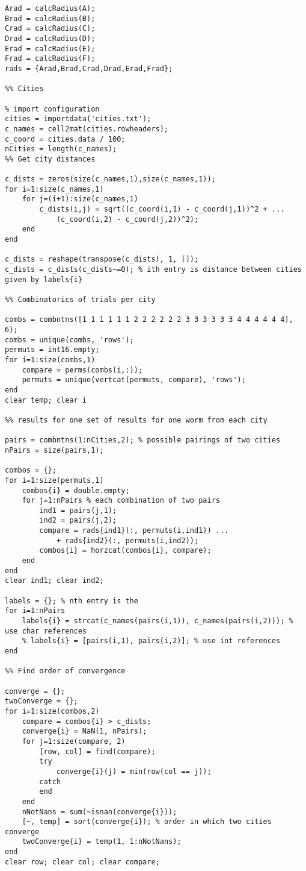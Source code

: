 \documentclass[10pt]{article}
\begin{document}
\begin{verbatim}
Arad = calcRadius(A);
Brad = calcRadius(B);
Crad = calcRadius(C);
Drad = calcRadius(D);
Erad = calcRadius(E);
Frad = calcRadius(F);
rads = {Arad,Brad,Crad,Drad,Erad,Frad};

%% Cities

% import configuration
cities = importdata('cities.txt');
c_names = cell2mat(cities.rowheaders);
c_coord = cities.data / 100;
nCities = length(c_names);
%% Get city distances

c_dists = zeros(size(c_names,1),size(c_names,1));
for i=1:size(c_names,1)
    for j=(i+1):size(c_names,1)
        c_dists(i,j) = sqrt((c_coord(i,1) - c_coord(j,1))^2 + ...
            (c_coord(i,2) - c_coord(j,2))^2);
    end
end

c_dists = reshape(transpose(c_dists), 1, []);
c_dists = c_dists(c_dists~=0); % ith entry is distance between cities given by labels{i}

%% Combinatorics of trials per city

combs = combntns([1 1 1 1 1 1 2 2 2 2 2 2 3 3 3 3 3 3 4 4 4 4 4 4], 6);
combs = unique(combs, 'rows');
permuts = int16.empty;
for i=1:size(combs,1)
    compare = perms(combs(i,:));
    permuts = unique(vertcat(permuts, compare), 'rows');
end
clear temp; clear i

%% results for one set of results for one worm from each city

pairs = combntns(1:nCities,2); % possible pairings of two cities
nPairs = size(pairs,1);

combos = {};
for i=1:size(permuts,1) 
    combos{i} = double.empty;
    for j=1:nPairs % each combination of two pairs
        ind1 = pairs(j,1);
        ind2 = pairs(j,2);
        compare = rads{ind1}(:, permuts(i,ind1)) ...
            + rads{ind2}(:, permuts(i,ind2));
        combos{i} = horzcat(combos{i}, compare);
    end
end
clear ind1; clear ind2;

labels = {}; % nth entry is the 
for i=1:nPairs
    labels{i} = strcat(c_names(pairs(i,1)), c_names(pairs(i,2))); % use char references
    % labels{i} = [pairs(i,1), pairs(i,2)]; % use int references
end

%% Find order of convergence

converge = {};
twoConverge = {};
for i=1:size(combos,2)
    compare = combos{i} > c_dists;
    converge{i} = NaN(1, nPairs);
    for j=1:size(compare, 2)
        [row, col] = find(compare);
        try
            converge{i}(j) = min(row(col == j));
        catch
        end
    end
    nNotNans = sum(~isnan(converge{i}));
    [~, temp] = sort(converge{i}); % order in which two cities converge
    twoConverge{i} = temp(1, 1:nNotNans);
end
clear row; clear col; clear compare;


\end{verbatim}
\end{document}
